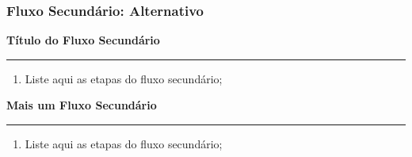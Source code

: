 \documentclass{article}
\begin{document}
  \subsubsection{\color{black}Fluxo Secundário: Alternativo}
    \begin{secondaryflow} 
      \item \textbf{Título do Fluxo Secundário}
      \hrule
        \vspace*{0.3cm}
        \begin{enumerate}
          \item Liste aqui as etapas do fluxo secundário;
        \end{enumerate}
      \item \textbf{Mais um Fluxo Secundário}
      \hrule
        \vspace*{0.3cm}
        \begin{enumerate}
          \item Liste aqui as etapas do fluxo secundário;
        \end{enumerate}
  \end{secondaryflow}  
  
% 
% 
\end{document}
